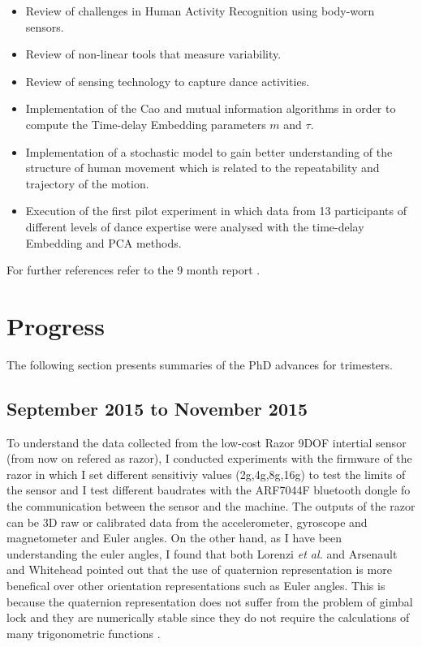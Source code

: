 \documentclass[9pt,journal,onecolumn,compsoc]{IEEEtran}
\begin{document}
\begin{itemize}
 \item Review of challenges in Human Activity Recognition using body-worn sensors.
 \item Review of non-linear tools that measure variability.
 \item Review of sensing technology to capture dance activities.
 \item Implementation of the Cao and mutual information algorithms in order 
    to compute the Time-delay Embedding parameters $m$ and $\tau$.
 \item Implementation of a stochastic model to gain better understanding of the 
 structure of human movement which is related to the repeatability and trajectory of the motion.
 \item Execution of the first pilot experiment in which data from 13 participants of different 
 levels of dance expertise were analysed with the time-delay Embedding and PCA methods.
\end{itemize}

For further references refer to the 9 month report \cite{mxochicale_9monthreport}.

\section{Progress}

The following section presents summaries of the PhD advances for trimesters.

\subsection{September 2015 to November 2015}

To understand the data collected from the low-cost Razor 9DOF intertial sensor
(from now on refered as razor),
I conducted experiments with the firmware of the razor in which I set 
different sensitiviy values (2g,4g,8g,16g) to test the limits of the sensor
and I test different baudrates 
with the ARF7044F bluetooth dongle fo the communication between the sensor and the machine.
The outputs of the razor can be 3D raw or calibrated data from the accelerometer,
gyroscope and magnetometer and Euler angles.
On the other hand, as I have been understanding the euler angles, I found that both Lorenzi \textit{et al.} 
and Arsenault and Whitehead pointed out that the use of quaternion representation is more benefical over 
other orientation representations such as Euler angles.
This is because the quaternion representation does not suffer from the problem of gimbal lock
and they are numerically stable 
since they do not require the calculations of many trigonometric functions \cite{Lorenzi2015, Arsenault2015_a, Munkundan2002}.
\end{document}
